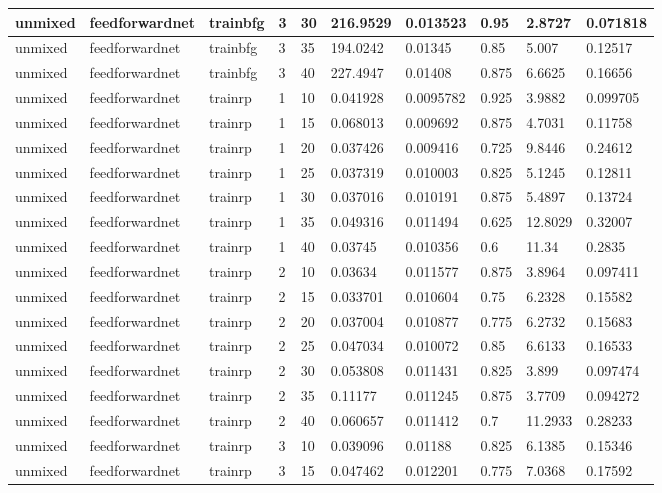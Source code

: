 \begin{longtable}{lllllllll}
unmixed & feedforwardnet & trainbfg & 3 & 30 & 216.9529 & 0.013523 & 0.95 & 2.8727 & 0.071818 \\ \hline 
unmixed & feedforwardnet & trainbfg & 3 & 35 & 194.0242 & 0.01345 & 0.85 & 5.007 & 0.12517 \\ \hline 
unmixed & feedforwardnet & trainbfg & 3 & 40 & 227.4947 & 0.01408 & 0.875 & 6.6625 & 0.16656 \\ \hline 
unmixed & feedforwardnet & trainrp & 1 & 10 & 0.041928 & 0.0095782 & 0.925 & 3.9882 & 0.099705 \\ \hline 
unmixed & feedforwardnet & trainrp & 1 & 15 & 0.068013 & 0.009692 & 0.875 & 4.7031 & 0.11758 \\ \hline 
unmixed & feedforwardnet & trainrp & 1 & 20 & 0.037426 & 0.009416 & 0.725 & 9.8446 & 0.24612 \\ \hline 
unmixed & feedforwardnet & trainrp & 1 & 25 & 0.037319 & 0.010003 & 0.825 & 5.1245 & 0.12811 \\ \hline 
unmixed & feedforwardnet & trainrp & 1 & 30 & 0.037016 & 0.010191 & 0.875 & 5.4897 & 0.13724 \\ \hline 
unmixed & feedforwardnet & trainrp & 1 & 35 & 0.049316 & 0.011494 & 0.625 & 12.8029 & 0.32007 \\ \hline 
unmixed & feedforwardnet & trainrp & 1 & 40 & 0.03745 & 0.010356 & 0.6 & 11.34 & 0.2835 \\ \hline 
unmixed & feedforwardnet & trainrp & 2 & 10 & 0.03634 & 0.011577 & 0.875 & 3.8964 & 0.097411 \\ \hline 
unmixed & feedforwardnet & trainrp & 2 & 15 & 0.033701 & 0.010604 & 0.75 & 6.2328 & 0.15582 \\ \hline 
unmixed & feedforwardnet & trainrp & 2 & 20 & 0.037004 & 0.010877 & 0.775 & 6.2732 & 0.15683 \\ \hline 
unmixed & feedforwardnet & trainrp & 2 & 25 & 0.047034 & 0.010072 & 0.85 & 6.6133 & 0.16533 \\ \hline 
unmixed & feedforwardnet & trainrp & 2 & 30 & 0.053808 & 0.011431 & 0.825 & 3.899 & 0.097474 \\ \hline 
unmixed & feedforwardnet & trainrp & 2 & 35 & 0.11177 & 0.011245 & 0.875 & 3.7709 & 0.094272 \\ \hline 
unmixed & feedforwardnet & trainrp & 2 & 40 & 0.060657 & 0.011412 & 0.7 & 11.2933 & 0.28233 \\ \hline 
unmixed & feedforwardnet & trainrp & 3 & 10 & 0.039096 & 0.01188 & 0.825 & 6.1385 & 0.15346 \\ \hline 
unmixed & feedforwardnet & trainrp & 3 & 15 & 0.047462 & 0.012201 & 0.775 & 7.0368 & 0.17592 \\ \hline 

\end{longtable}
